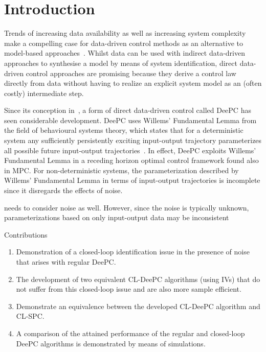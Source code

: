 \section{Introduction}
Trends of increasing data availability as well as increasing system complexity make a compelling case for data-driven control methods as an alternative to model-based approaches~\cite{Hou2013}. Whilst data can be used with indirect data-driven approaches to synthesise a model by means of system identification, direct data-driven control approaches are promising because they derive a control law directly from data without having to realize an explicit system model as an (often costly) intermediate step.

Since its conception in~\cite{Coulson2019}, a form of direct data-driven control called \ac{DeePC} has seen considerable development. \ac{DeePC} uses Willems' Fundamental Lemma from the field of behavioural systems theory, which states that for a deterministic system any sufficiently persistently exciting input-output trajectory parameterizes all possible future input-output trajectories~\cite{Willems2005}. In effect, \ac{DeePC} exploits Willems' Fundamental Lemma in a receding horizon optimal control framework found also in \ac{MPC}. For non-deterministic systems, the parameterization described by Willems' Fundamental Lemma in terms of input-output trajectories is incomplete since it disregards the effects of noise. 

needs to consider noise as well. However, since the noise is typically unknown, parameterizations based on only input-output data may be inconsistent


Contributions
\begin{enumerate}
\item Demonstration of a closed-loop identification issue in the presence of noise that arises with regular \ac{DeePC}.
\item The development of two equivalent \ac{CL-DeePC} algorithms (using \ac{IVs}) that do not suffer from this closed-loop issue and are also more sample efficient.
\item Demonstrate an equivalence between the developed \ac{CL-DeePC} algorithm and \ac{CL-SPC}.
\item A comparison of the attained performance of the regular and closed-loop \ac{DeePC} algorithms is demonstrated by means of simulations.
\end{enumerate}